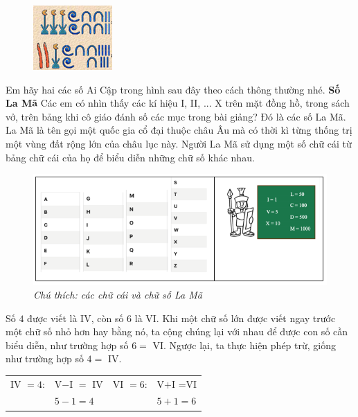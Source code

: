 	\vskip 0.1cm 
	
	\begin{figure}
		\vspace*{-10pt}
		\centering
		\captionsetup{labelformat=empty, justification=centering}
		\includegraphics[scale=1]{13}
		\vspace*{-10pt}
	\end{figure}                          
	Em hãy hai các số Ai Cập trong hình sau đây theo cách thông thường nhé.    
	\vskip 0.1cm
	\textbf{\color{toancuabi}Số La Mã}
	\vskip 0.1cm
	Các em có nhìn thấy các kí hiệu I, II, ... X trên mặt đồng hồ, trong sách vở, trên bảng khi cô giáo đánh số các mục trong bài giảng? Đó là các số La Mã. La Mã là tên gọi một quốc gia cổ đại thuộc châu Âu mà có thời kì từng thống trị một vùng đất rộng lớn của châu lục này. Người La Mã sử dụng một số chữ cái từ bảng chữ cái của họ để biểu diễn những chữ số khác nhau.
	\begin{figure}[H]
		\centering
		\vspace*{-10pt}
		\captionsetup{labelformat= empty, justification=centering}
		\includegraphics[width=1\linewidth]{111}
		\caption{\small\textit{Chú thích: các chữ cái và chữ số La Mã}}
		\vspace*{-10pt}
	\end{figure}
	Số $4$ được viết là IV, còn số $6$ là VI. Khi một chữ số lớn được viết ngay trước  một chữ số nhỏ hơn hay bằng nó, ta cộng chúng lại với nhau để được con số cần biểu diễn, như trường hợp số $6=$ VI. Ngược lại, ta thực hiện phép trừ, giống như trường hợp số $4=$ IV.
	\begin{table}[H]
		\vspace*{-5pt}
		\centering
			\begin{tabular}{|l l|l l|}
			\hline
			IV $=4$:&    V$-$I $=$ IV & VI $=6$:&    V$+$I =VI\\
			&$5-1=4$ & &$5+1=6$\\
			\hline
		\end{tabular}
		\vspace*{-10pt}
	\end{table}
